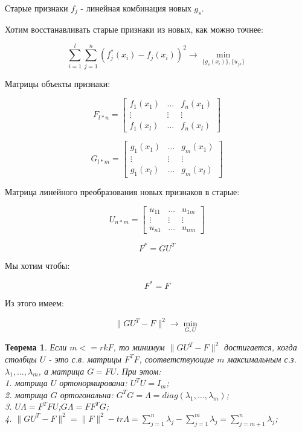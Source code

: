 \documentclass[12pt,a4paper]{article}
\newtheorem{theorem}{Теорема}
\begin{document}
Старые признаки $f_j$ - линейная комбинация новых $g_s$.

Хотим восстанавливать старые признаки из новых, как можно точнее:

$$
    \sum_{i=1}^{l}\sum_{j=1}^{n}(f_j^{*}(x_i) - f_j(x_i))^2 \rightarrow \min\limits_{\{g_s(x_i)\}, \{u_{js}\}}
$$

Матрицы объекты признаки:

\[
F_{l * n}
=
\begin{bmatrix}
    f_1(x_1) & \dots  & f_n(x_1) \\
    \vdots & \vdots & \vdots \\
    f_1(x_l) & \dots  & f_n(x_l)
\end{bmatrix}
\]

\[
G_{l * m}
=
\begin{bmatrix}
    g_1(x_1) & \dots  & g_m(x_1) \\
    \vdots & \vdots & \vdots \\
    g_1(x_l) & \dots  & g_m(x_l)
\end{bmatrix}
\]

Матрица линейного преобразования новых признаков в старые:

\[
U_{n * m}
=
\begin{bmatrix}
    u_{11} & \dots  & u_{1m} \\
    \vdots & \vdots & \vdots \\
    u_{n1} & \dots  & u_{nm}
\end{bmatrix}
\]

$$
    F^* = GU^T
$$

Мы хотим чтобы:

$$
    F^* = F
$$

Из этого имеем:

$$
    \| GU^{T} - F \|^2 \rightarrow \min\limits_{G, U}
$$

\begin{theorem} \label{t1} 
    Если $m <= rkF$, то минимум $\| GU^T - F\|^2$ достигается, когда столбцы $U$ - это с.в. матрицы $F^TF$, соответствующие $m$ максимальным с.з. $\lambda_1, \ldots, \lambda_m$, а матрица $G=FU$.
    При этом:
    \\1. матрица $U$ ортонормирована: $U^TU=I_m$;\\
    2. матрица $G$ ортогональна: $G^TG=\Lambda=diag(\lambda_1, \ldots, \lambda_m)$;\\
    3. $U\Lambda=F^TFU$;$G\Lambda=FF^TG$;\\
    4. $\|GU^T - F\|^2 = \|F\|^2 - tr\Lambda = \sum_{j=1}^{n}\lambda_j - \sum_{j=1}^{m}\lambda_j=\sum_{j=m+1}^{n}\lambda_j$;\\
\end{theorem}
\end{document}
